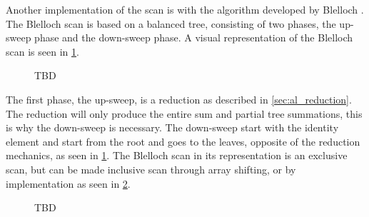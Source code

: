 Another implementation of the scan is with the algorithm developed by Blelloch \cite{BlellochTR90}. The Blelloch scan is based on a balanced tree, consisting of two phases, the up-sweep phase and the down-sweep phase. A visual representation of the Blelloch scan is seen in \cref{fig:scan_blelloch}. 

\begin{figure}[ht]
	\centering
	\caption{TBD}
	\label{fig:scan_blelloch}
\end{figure}

The first phase, the up-sweep, is a reduction as described in \cref{sec:al_reduction}. The reduction will only produce the entire sum and partial tree summations, this is why the down-sweep is necessary. The down-sweep start with the identity element and start from the root and goes to the leaves, opposite of the reduction mechanics, as seen in \cref{fig:scan_blelloch}. The Blelloch scan in its representation is an exclusive scan, but can be made inclusive scan through array shifting, or by implementation as seen in \cref{fig:scan_inclusive}.

\begin{figure}[ht]
	\centering
	\caption{TBD}
	\label{fig:scan_inclusive}
\end{figure}

